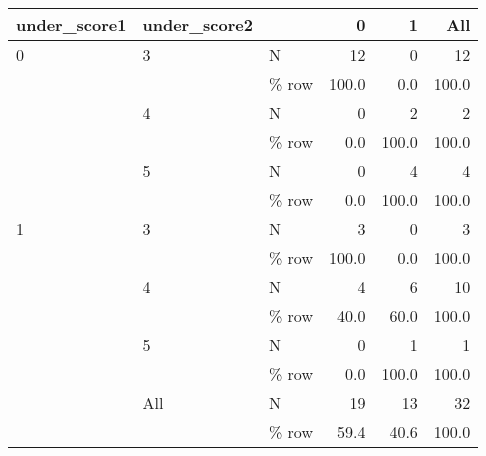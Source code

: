 \begin{table}
\centering
\begin{tabular}[t]{lllrrr}
\toprule
under\_score1 & under\_score2 &   & 0 & 1 & All\\
\midrule
0 & 3 & N & 12 & 0 & 12\\
 &  & \% row & \num{100.0} & \num{0.0} & \num{100.0}\\
 & 4 & N & 0 & 2 & 2\\
 &  & \% row & \num{0.0} & \num{100.0} & \num{100.0}\\
 & 5 & N & 0 & 4 & 4\\
 &  & \% row & \num{0.0} & \num{100.0} & \num{100.0}\\
1 & 3 & N & 3 & 0 & 3\\
 &  & \% row & \num{100.0} & \num{0.0} & \num{100.0}\\
 & 4 & N & 4 & 6 & 10\\
 &  & \% row & \num{40.0} & \num{60.0} & \num{100.0}\\
 & 5 & N & 0 & 1 & 1\\
 &  & \% row & \num{0.0} & \num{100.0} & \num{100.0}\\
 & All & N & 19 & 13 & 32\\
 &  & \% row & \num{59.4} & \num{40.6} & \num{100.0}\\
\bottomrule
\end{tabular}
\end{table}

